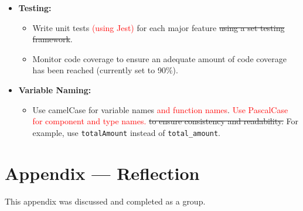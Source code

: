 \documentclass{article}
\begin{document}
\begin{itemize}
    \item \textbf{Testing:}
    \begin{itemize}
        \item Write unit tests \textcolor{red}{(using Jest)} for each major feature \sout{using a set testing framework}.
        \item Monitor code coverage to ensure an adequate amount of code coverage has been reached (currently set to 90\%).
    \end{itemize}
    \item \textbf{Variable Naming:}
  \begin{itemize}
      \item Use camelCase for variable names \textcolor{red}{and function names}. \textcolor{red}{Use PascalCase for component and type names.} \sout{to ensure consistency and readability.} For example, use \texttt{totalAmount} instead of \texttt{total\_amount}.
  \end{itemize}
\end{itemize}

\newpage{}

\section*{Appendix --- Reflection}

This appendix was discussed and completed as a group.
\end{document}
